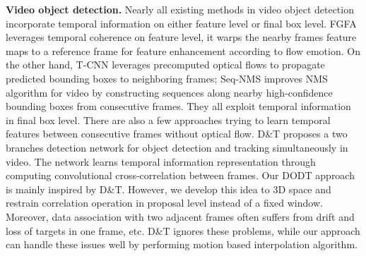 \documentclass[letterpaper, 10pt, conference]{ieeeconf}  %
\begin{document}
\textbf{Video object detection.} Nearly all existing methods in video object detection incorporate temporal information on either feature level or final box level. FGFA \cite{zhu2017flow} leverages temporal coherence on feature level, it warps the nearby frames feature maps to a reference frame for feature enhancement according to flow emotion. On the other hand, T-CNN \cite{kang2018t, kang2016object} leverages precomputed optical flows to propagate predicted bounding boxes to neighboring frames; Seq-NMS \cite{han2016seq} improves NMS algorithm for video by constructing sequences along nearby high-confidence bounding boxes from consecutive frames. They all exploit temporal information in final box level. There are also a few approaches trying to learn temporal features between consecutive frames without optical flow. D\&T \cite{feichtenhofer2017detect} proposes a two branches detection network for object detection and tracking simultaneously in video. The network learns temporal information representation through computing convolutional cross-correlation between frames. Our DODT approach is mainly inspired by D\&T. However, we develop this idea to 3D space and restrain correlation operation in proposal level instead of a fixed window. Moreover, data association with two adjacent frames often suffers from drift and loss of targets in one frame, etc. D\&T ignores these problems, while our approach can handle these issues well by performing motion based interpolation algorithm.
\end{document}
